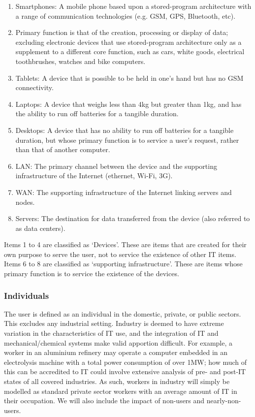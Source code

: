 \documentclass[conference]{IEEEtran}
\begin{document}
\begin{enumerate}
\item Smartphones: A mobile phone based upon a stored-program
  architecture with a range of communication technologies (e.g. GSM, GPS,
  Bluetooth, etc).
\item Primary function is that of the creation, processing or display
  of data; excluding electronic devices that use stored-program
  architecture only as a supplement to a different core function, such
  as cars, white goods, electrical toothbrushes, watches and bike
  computers.
\item Tablets: A device that is possible to be held in one’s hand but
  has no GSM connectivity.
\item Laptops: A device that weighs less than 4kg but greater
  than 1kg, and has the ability to run off batteries for a
  tangible duration.
\item Desktops: A device that has no ability to run off batteries for
  a tangible duration, but whose primary function is to service a
  user’s request, rather than that of another computer.
\item LAN: The primary channel between the device and the supporting
  infrastructure of the Internet (ethernet, Wi-Fi, 3G).
\item WAN: The supporting infrastructure of the Internet linking
  servers and nodes.
\item Servers: The destination for data transferred from the device
  (also referred to as data centers).
\end{enumerate}

Items 1 to 4 are classified as `Devices'. These are items that are
created for their own purpose to serve the user, not to service the
existence of other IT items. Items 6 to 8 are classified as
`supporting infrastructure'. These are items whose primary function is
to service the existence of the devices.

\subsubsection{Individuals}

The user is defined as an individual in the domestic, private, or
public sectors. This excludes any industrial setting. Industry is
deemed to have extreme variation in the characteristics of IT use, and
the integration of IT and mechanical/chemical systems make valid
apportion difficult. For example, a worker in an aluminium refinery
may operate a computer embedded in an electrolysis machine with a
total power consumption of over 1MW; how much of this can be
accredited to IT could involve extensive analysis of pre- and post-IT
states of all covered industries. As such, workers in industry will
simply be modelled as standard private sector workers with an average
amount of IT in their occupation. We will also include the impact of
non-users and nearly-non-users.
\end{document}
